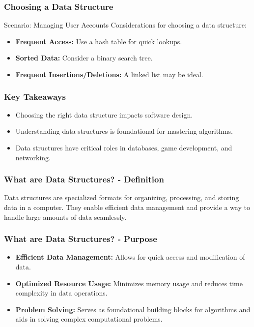 \documentclass{beamer}
\begin{document}
\begin{frame}[fragile]
    \frametitle{Choosing a Data Structure}
    \begin{block}{Scenario: Managing User Accounts}
        Considerations for choosing a data structure:
        \begin{itemize}
            \item \textbf{Frequent Access:} Use a hash table for quick lookups.
            \item \textbf{Sorted Data:} Consider a binary search tree.
            \item \textbf{Frequent Insertions/Deletions:} A linked list may be ideal.
        \end{itemize}
    \end{block}
\end{frame}

\begin{frame}[fragile]
    \frametitle{Key Takeaways}
    \begin{itemize}
        \item Choosing the right data structure impacts software design.
        \item Understanding data structures is foundational for mastering algorithms.
        \item Data structures have critical roles in databases, game development, and networking.
    \end{itemize}
\end{frame}

\begin{frame}[fragile]
    \frametitle{What are Data Structures? - Definition}
    Data structures are specialized formats for organizing, processing, and storing data in a computer. 
    They enable efficient data management and provide a way to handle large amounts of data seamlessly.
\end{frame}

\begin{frame}[fragile]
    \frametitle{What are Data Structures? - Purpose}
    \begin{itemize}
        \item \textbf{Efficient Data Management:} Allows for quick access and modification of data.
        \item \textbf{Optimized Resource Usage:} Minimizes memory usage and reduces time complexity in data operations.
        \item \textbf{Problem Solving:} Serves as foundational building blocks for algorithms and aids in solving complex computational problems.
    \end{itemize}
\end{frame}
\end{document}
